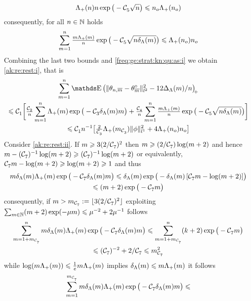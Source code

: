 \begin{pro}
\begin{equation*}
    \miSv[\ssY]\ssY\exp\big(-\cst{5}\sqrt{\ssY}\big)\leq\ssY_{o}\miSv[\ssY_{o}]
  \end{equation*}
 consequently, for all $\ssY\in\Nz$ holds
 \begin{displaymath}
 \sum_{\Di=1}^{\ssY}\tfrac{\Di\miSv}{\ssY}\exp\big(-\cst{5}\sqrt{n\cmSv}\big)\leq \miSv[\ssY_{o}]\ssY_{o}
\end{displaymath}
Combining the last two bounds and  \ref{freq:ge:strat:kn:qu:as:i}  we obtain \ref{ak:re:rest:i}, that is 
\begin{multline*}
\sum_{\Di=1}^{\ssY}\E\vectp{\Vnormlp{\txdfPr[\Di]-\xdfPr[\Di]}^2-12\DipenSv/\ssY}\\\hfill\leq \cst{1}\bigg[\tfrac{\cst{2}}{\ssY}\sum_{\Di=1}^{\ssY}
\miSv\exp\big(-\cst{3}\cmSv\Di\big)+\tfrac{\cst{4}}{n}\sum_{\Di=1}^{\ssY}\tfrac{\Di\miSv}{n}\exp\big(-\cst{5}\sqrt{n\cmSv}\big)
\bigg]\\\leq \cst{1}\ssY^{-1}\big[\tfrac{2}{\cst{3}}\miSv[\Di_{\cst{3}}]{\Vnormlp[1]{\fydf}^2}+4 \miSv[\ssY_{o}]\ssY_{o}\big]
\end{multline*}
Consider  \ref{ak:re:rest:ii}. If $\Di\geq 3(2/\cst{7})^2$ then 
$\Di\geq(2/\cst{7})\log(\Di+2)$ and
hence
$\Di-{(\cst{7})^{-1}}\log(\Di+2)\geq{(\cst{7})^{-1}}\log(\Di+2)$
or equivalently,
$\cst{7}\Di-\log(\Di+2)\geq\log(\Di+2)\geq1$
and thus
\begin{multline*}
\Di\cmSv\miSv\exp\big(-\cst{7}\cmSv\Di\big)\leq
\cmSv\exp\big(-\cmSv\,[\cst{7}\Di - \log(\Di+2)]\big)\\\leq
(\Di+2)\exp\big(-\cst{7}\Di\big)%
\end{multline*}
consequently, if $\Di>\Di_{\cst{7}}:=\floor{3({2/\cst{7}})^2}$ exploiting $\sum_{\Di\in\Nz}(\Di+2)\exp(-\mu\Di)\leq \mu^{-2}+ 2\mu^{-1}$
follows
\begin{multline*}
\sum_{\Di=1+\Di_{\cst{7}}}^{\ssY}\Di\cmSv\miSv\exp\big(-\cst{7}\cmSv\Di\big)\leq
\sum_{\Di=1+\Di_{\cst{7}}}^{\ssY}(k+2)\exp\big(-\cst{7}\Di\big)
\\\leq
(\cst{7})^{-2}+{2/\cst{7}}\leq \Di_{\cst{7}}^2
\end{multline*}
while $\log(\Di\miSv)\leq \tfrac{1}{e}\Di\miSv$ implies
$\cmSv\leq\Di\miSv$ it follows
\begin{multline*}
  \sum_{\Di=1}^{\Di_{\cst{7}}}\Di\cmSv\miSv\exp\big(-\cst{7}\cmSv\Di\big)\leq

\end{multline*}
\end{pro}
